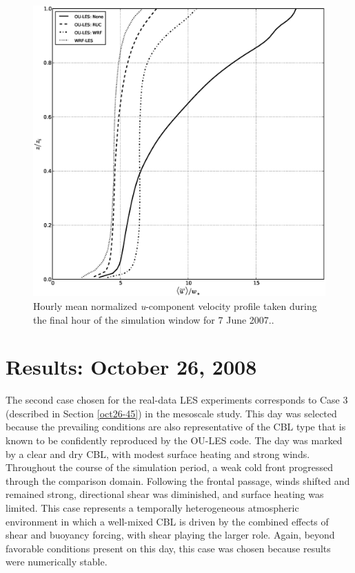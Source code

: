 \begin{figure}[H]
\begin{center}
\includegraphics[width=\textwidth]{figures/chapter6/velocity_20070607}
\end{center}
\caption{Hourly mean normalized \textit{u}-component velocity profile taken during the final hour of the simulation window for 7 June 2007..}
\label{figure614}
\end{figure}
\newpage


\section{Results: October 26, 2008}
\label{res-63}

The second case chosen for the real-data LES experiments corresponds to Case 3 (described in Section \autoref{oct26-45}) in the mesoscale study. This day was selected because the prevailing conditions are also representative of the CBL type that is known to be confidently reproduced by the OU-LES code. The day was marked by a clear and dry CBL, with modest surface heating and strong winds. Throughout the course of the simulation period, a weak cold front progressed through the comparison domain. Following the frontal passage, winds shifted and remained strong, directional shear was diminished, and surface heating was limited. This case represents a temporally heterogeneous atmospheric environment in which a well-mixed CBL is driven by the combined effects of shear and buoyancy forcing, with shear playing the larger role. Again, beyond favorable conditions present on this day, this case was chosen because results were numerically stable.

